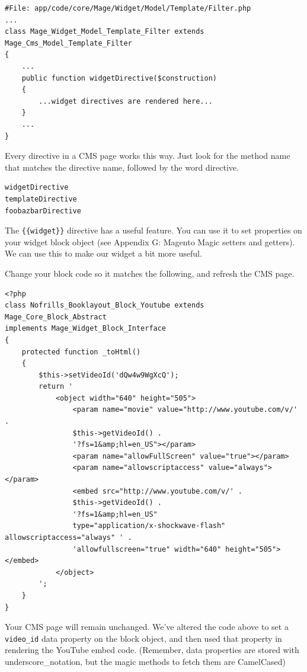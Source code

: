 \documentclass[oneside]{book}
\begin{document}
\begin{lstlisting}
#File: app/code/core/Mage/Widget/Model/Template/Filter.php
...
class Mage_Widget_Model_Template_Filter extends Mage_Cms_Model_Template_Filter
{
    ...
    public function widgetDirective($construction)
    {
        ...widget directives are rendered here...
    }
    ...
}

\end{lstlisting}


Every directive in a CMS page works this way.  Just look for the method name that matches the directive name, followed by the word directive.

\begin{lstlisting}
widgetDirective
templateDirective
foobazbarDirective

\end{lstlisting}


The \footnotesize\texttt{\{\{widget\}\}} \normalsize  directive has a useful feature. You can use it to set properties on your widget block object (see Appendix G: Magento Magic setters and getters).  We can use this to make our widget a bit more useful.  

Change your block code so it matches the following, and refresh the CMS page.

\begin{lstlisting}
<?php
class Nofrills_Booklayout_Block_Youtube extends Mage_Core_Block_Abstract
implements Mage_Widget_Block_Interface
{
    protected function _toHtml()
    {               
        $this->setVideoId('dQw4w9WgXcQ');   
        return '
            <object width="640" height="505">
                <param name="movie" value="http://www.youtube.com/v/' .
                $this->getVideoId() .                   
                '?fs=1&amp;hl=en_US"></param>
                <param name="allowFullScreen" value="true"></param>
                <param name="allowscriptaccess" value="always"></param>
                <embed src="http://www.youtube.com/v/' .
                $this->getVideoId() . 
                '?fs=1&amp;hl=en_US" 
                type="application/x-shockwave-flash" allowscriptaccess="always" ' . 
                'allowfullscreen="true" width="640" height="505"></embed>
            </object>           
        ';
    }
}

\end{lstlisting}


Your CMS page will remain unchanged.  We've altered the code above to set a \footnotesize\texttt{video\_id} \normalsize  data property on the block object, and then used that property in rendering the YouTube embed code. (Remember, data properties are stored with underscore\_notation, but the magic methods to fetch them are CamelCased)
\end{document}
